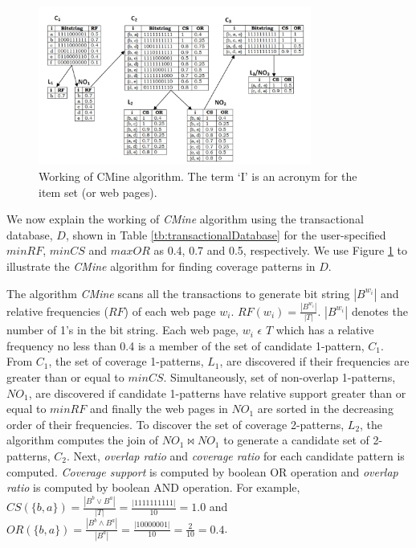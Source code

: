 \begin{figure}[htp]\centering
\centerline {\includegraphics[height=0.4\textwidth, width=0.8\textwidth, natwidth=800, natheight=400]{visuals/CMine.jpg}}
\caption{Working of CMine algorithm. The term `I' is an acronym for the item set (or web pages).} \label{AprioriAlgorithm}
\end{figure}
We now explain the working of \emph{CMine} algorithm using the transactional database, $D$, shown in Table \ref{tb:transactionalDatabase} for the user-specified $minRF$, $minCS$ and $maxOR$ as 0.4, 0.7 and 0.5, respectively. We use Figure \ref{AprioriAlgorithm} to illustrate the \emph{CMine} algorithm for finding coverage patterns in $D$.

The algorithm \emph{CMine} scans all the transactions to generate bit string $|B^{w_i}|$ and relative frequencies ($RF$) of each web page $w_i$. $RF(w_i) = \frac{|B^{w_i}|}{|T|}$. $|B^{w_i}|$ denotes the number of 1's in the bit string. Each web page, $w_i$  $\epsilon$ $T$ which has a relative frequency no less than 0.4 is a member of the set of candidate 1-pattern, $C_1$. From $C_1$, the set of coverage 1-patterns, $L_1$, are discovered if their frequencies are greater than or equal to $minCS$. Simultaneously, set of non-overlap 1-patterns, $NO_1$, are discovered if candidate 1-patterns have relative support greater than or equal to $minRF$ and finally the web pages in $NO_1$ are sorted in the decreasing order of their frequencies. To discover the set of coverage 2-patterns, $L_2$, the algorithm computes the join of $NO_1 \Join NO_1$ to generate a candidate set of 2-patterns, $C_2$. Next, \emph{overlap ratio} and \emph{coverage ratio} for each candidate pattern is computed. \emph{Coverage support} is computed by boolean OR operation and \emph{overlap ratio} is computed by boolean AND operation. For example, $CS(\{b,a\}) = \frac{|B^b \lor B^a|}{|T|} = \frac{|1111111111|}{10} = 1.0$ and $OR(\{b,a\}) = \frac{|B^b \land B^a|}{|B^a|} = \frac{|10000001|}{10} = \frac{2}{10} = 0.4$.

